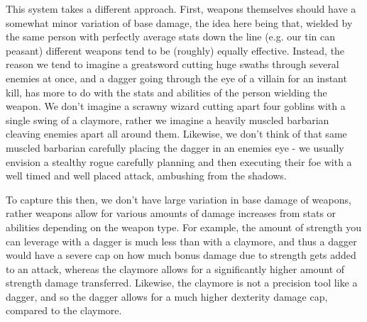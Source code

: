 \documentclass{article}
\begin{document}
            This system takes a different approach. First, weapons themselves should have a somewhat minor variation of base damage, the idea here being that, wielded by the same person with perfectly average stats down the line (e.g. our tin can peasant) different weapons tend to be (roughly) equally effective. Instead, the reason we tend to imagine a greatsword cutting huge swaths through several enemies at once, and a dagger going through the eye of a villain for an instant kill, has more to do with the stats and abilities of the person wielding the weapon. We don't imagine a scrawny wizard cutting apart four goblins with a single swing of a claymore, rather we imagine a heavily muscled barbarian cleaving enemies apart all around them. Likewise, we don't think of that same muscled barbarian carefully placing the dagger in an enemies eye - we usually envision a stealthy rogue carefully planning and then executing their foe with a well timed and well placed attack, ambushing from the shadows.
            
            To capture this then, we don't have large variation in base damage of weapons, rather weapons allow for various amounts of damage increases from stats or abilities depending on the weapon type. For example, the amount of strength you can leverage with a dagger is much less than with a claymore, and thus a dagger would have a severe cap on how much bonus damage due to strength gets added to an attack, whereas the claymore allows for a significantly higher amount of strength damage transferred. Likewise, the claymore is not a precision tool like a dagger, and so the dagger allows for a much higher dexterity damage cap, compared to the claymore.
            
\end{document}
